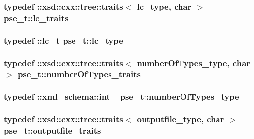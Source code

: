 \hypertarget{classpse__t_a3e552e037801ee7f00dbfb46a0a860f6}{
\subsubsection[{lc\-\_\-traits}]{\setlength{\rightskip}{0pt plus 5cm}typedef \-::xsd\-::cxx\-::tree\-::traits$<$ {\bf lc\-\_\-type}, char $>$ {\bf pse\-\_\-t\-::lc\-\_\-traits}}}\label{classpse__t_a3e552e037801ee7f00dbfb46a0a860f6}
\hypertarget{classpse__t_aa6a9bda12a405c1b9fb0baecbed9a1bb}{
\subsubsection[{lc\-\_\-type}]{\setlength{\rightskip}{0pt plus 5cm}typedef \-::{\bf lc\-\_\-t} {\bf pse\-\_\-t\-::lc\-\_\-type}}}\label{classpse__t_aa6a9bda12a405c1b9fb0baecbed9a1bb}
\hypertarget{classpse__t_af86f3cfbbdef30f8a4a5927642e947bf}{
\subsubsection[{number\-Of\-Types\-\_\-traits}]{\setlength{\rightskip}{0pt plus 5cm}typedef \-::xsd\-::cxx\-::tree\-::traits$<$ {\bf number\-Of\-Types\-\_\-type}, char $>$ {\bf pse\-\_\-t\-::number\-Of\-Types\-\_\-traits}}}\label{classpse__t_af86f3cfbbdef30f8a4a5927642e947bf}
\hypertarget{classpse__t_a3aa6a8cc1b9642304371fb935f6e1965}{
\subsubsection[{number\-Of\-Types\-\_\-type}]{\setlength{\rightskip}{0pt plus 5cm}typedef \-::{\bf xml\-\_\-schema\-::int\-\_\-} {\bf pse\-\_\-t\-::number\-Of\-Types\-\_\-type}}}\label{classpse__t_a3aa6a8cc1b9642304371fb935f6e1965}
\hypertarget{classpse__t_a1ea902d4f686908c24a487b7a16fcb0a}{
\subsubsection[{outputfile\-\_\-traits}]{\setlength{\rightskip}{0pt plus 5cm}typedef \-::xsd\-::cxx\-::tree\-::traits$<$ {\bf outputfile\-\_\-type}, char $>$ {\bf pse\-\_\-t\-::outputfile\-\_\-traits}}}\label{classpse__t_a1ea902d4f686908c24a487b7a16fcb0a}
